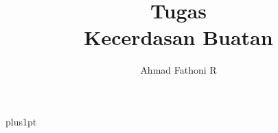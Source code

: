 \documentclass[12pt]{ociamthesis}  %
\title{Tugas \\[1ex]     %
        Kecerdasan Buatan}   %
\author{Ahmad Fathoni R}             %
\begin{document}
\baselineskip=18pt plus1pt

\setcounter{secnumdepth}{3}
\setcounter{tocdepth}{3}


\maketitle                  %

\begin{romanpages}          %
\tableofcontents            %
\listoffigures              %
\end{romanpages}            %


% 
% 
% 
% 
% 
% 
% 
% 
% 
% 
% 
% 
% 

% 
% 

\end{document}
